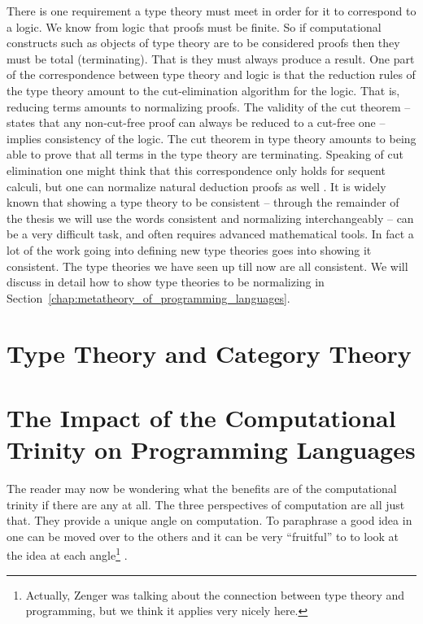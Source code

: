 There is one requirement a type theory must meet in order for it to
correspond to a logic.  We know from logic that proofs must be finite.
So if computational constructs such as objects of type theory are to
be considered proofs then they must be total (terminating).  That is
they must always produce a result.  One part of the correspondence
between type theory and logic is that the reduction rules of the type
theory amount to the cut-elimination algorithm for the logic.  That is,
reducing terms amounts to normalizing proofs.  The validity of the cut
theorem -- states that any non-cut-free proof can always be reduced to
a cut-free one -- implies consistency of the logic.  The cut theorem
in type theory amounts to being able to prove that all terms in the
type theory are terminating.  Speaking of cut elimination one might
think that this correspondence only holds for sequent calculi, but one
can normalize natural deduction proofs as well \cite{Prawitz:1965}.
It is widely known that showing a type theory to be consistent --
through the remainder of the thesis we will use the words consistent
and normalizing interchangeably -- can be a very difficult task, and
often requires advanced mathematical tools.  In fact a lot of the work
going into defining new type theories goes into showing it consistent.
The type theories we have seen up till now are all consistent.  We
will discuss in detail how to show type theories to be normalizing in
Section~\ref{chap:metatheory_of_programming_languages}.

\section{Type Theory and Category Theory}
\label{sec:tt_ct}


\section{The Impact of the Computational Trinity on Programming Languages}
\label{sec:three_perspectives_programming_languages}
The reader may now be wondering what the benefits are of the computational
trinity if there are any at all.  The three
perspectives of computation are all just that.  They provide a unique
angle on computation. To paraphrase \cite{Zenger:1997} a good idea in
one can be moved over to the others and it can be very ``fruitful'' to
to look at the idea at each angle\footnote{Actually, Zenger was
  talking about the connection between type theory and programming,
  but we think it applies very nicely here.} .

